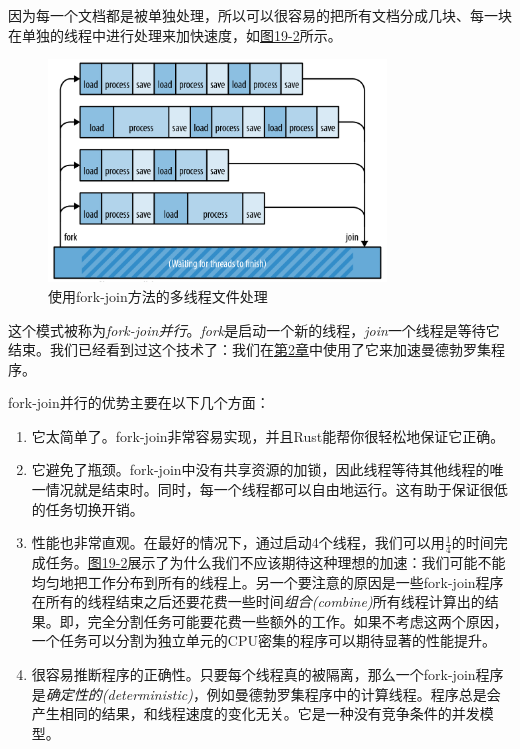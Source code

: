 因为每一个文档都是被单独处理，所以可以很容易的把所有文档分成几块、每一块在单独的线程中进行处理来加快速度，如\hyperref[f19-2]{图19-2}所示。

\begin{figure}[htbp]
    \centering
    \includegraphics[width=0.8\textwidth]{../img/f19-2.png}
    \caption{使用fork-join方法的多线程文件处理}
    \label{f19-2}
\end{figure}

这个模式被称为\emph{fork-join并行}。\emph{fork}是启动一个新的线程，\emph{join}一个线程是等待它结束。我们已经看到过这个技术了：我们在\hyperref[ch02]{第2章}中使用了它来加速曼德勃罗集程序。

fork-join并行的优势主要在以下几个方面：
\begin{enumerate}
    \item 它太简单了。fork-join非常容易实现，并且Rust能帮你很轻松地保证它正确。
    \item 它避免了瓶颈。fork-join中没有共享资源的加锁，因此线程等待其他线程的唯一情况就是结束时。同时，每一个线程都可以自由地运行。这有助于保证很低的任务切换开销。
    \item 性能也非常直观。在最好的情况下，通过启动4个线程，我们可以用$\frac{1}{4}$的时间完成任务。\hyperref[f19-2]{图19-2}展示了为什么我们不应该期待这种理想的加速：我们可能不能均匀地把工作分布到所有的线程上。另一个要注意的原因是一些fork-join程序在所有的线程结束之后还要花费一些时间\emph{组合(combine)}所有线程计算出的结果。即，完全分割任务可能要花费一些额外的工作。如果不考虑这两个原因，一个任务可以分割为独立单元的CPU密集的程序可以期待显著的性能提升。
    \item 很容易推断程序的正确性。只要每个线程真的被隔离，那么一个fork-join程序是\emph{确定性的(deterministic)}，例如曼德勃罗集程序中的计算线程。程序总是会产生相同的结果，和线程速度的变化无关。它是一种没有竞争条件的并发模型。
\end{enumerate}

